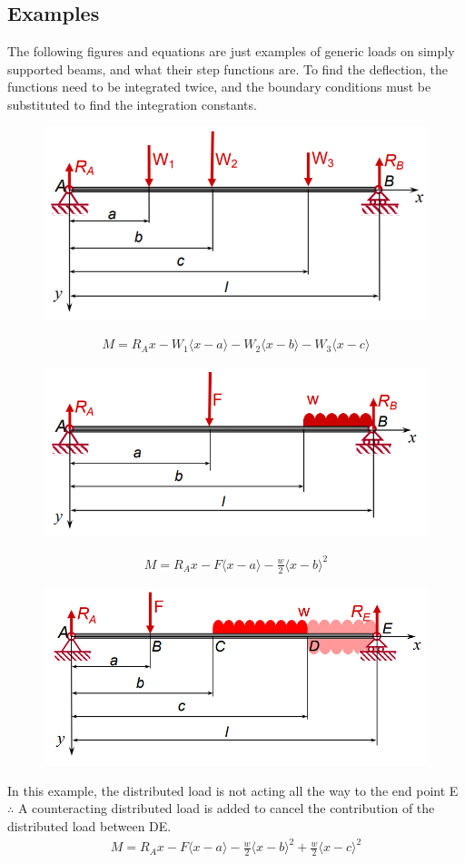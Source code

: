 \documentclass[class=report, crop=false, 12pt,a4paper]{standalone}
\begin{document}
\subsection{Examples}
The following figures and equations are just examples of generic loads on simply supported beams, and what their step functions are. To find the deflection, the functions need to be integrated twice, and the boundary conditions must be substituted to find the integration constants.
\begin{figure}[H]
  \centering
  \includegraphics[width = 0.65 \textwidth]{../img/beam8.PNG}
\end{figure}
\begin{gather}
  M = R_Ax - W_1\langle x-a \rangle - W_2\langle x-b \rangle - W_3\langle x-c \rangle 
\end{gather}
\begin{figure}[H]
  \centering
  \includegraphics[width = 0.7 \textwidth]{../img/beam9.PNG}
\end{figure}
\begin{gather}
  M = R_Ax - F\langle x-a \rangle - \frac{w}{2}\langle x-b \rangle^2
\end{gather}
\begin{figure}[H]
  \centering
  \includegraphics[width = 0.65 \textwidth]{../img/beam10.PNG}
\end{figure}
In this example, the distributed load is not acting all the way to the end point E $\therefore$ A counteracting distributed load is added to cancel the contribution of the distributed load between DE.
\begin{gather}
  M = R_Ax - F\langle x-a \rangle - \frac{w}{2}\langle x-b \rangle^2 + \frac{w}{2}\langle x-c \rangle^2
\end{gather}
\end{document}
